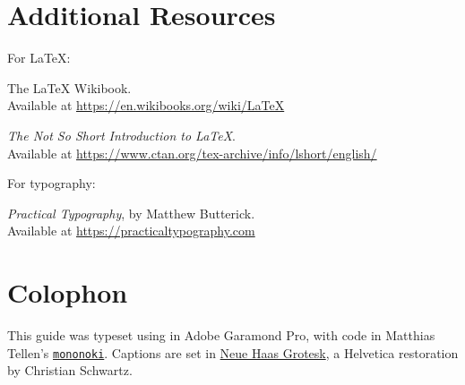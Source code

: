 \chapter{Additional Resources}

For \LaTeX:

\begin{adjustwidth}{1.5em}{0pt}
The \LaTeX{} Wikibook. \\
Available at \url{https://en.wikibooks.org/wiki/LaTeX}

\textit{The Not So Short Introduction to \LaTeX}. \\
Available at \url{https://www.ctan.org/tex-archive/info/lshort/english/}
\end{adjustwidth}
\vspace{0.3in}

For typography:

\begin{adjustwidth}{1.5em}{0pt}
\textit{Practical Typography}, by Matthew Butterick. \\
Available at \url{https://practicaltypography.com}
\end{adjustwidth}

\parindent 0pt
\theendnotes

\chapter{Colophon}

This guide was typeset using \LuaLaTeX{}
in Adobe Garamond Pro,
with code in Matthias Tellen's
\href{https://madmalik.github.io/mononoki/}{\texttt{mononoki}}.
Captions are set in
\href{http://www.fontbureau.com/NHG/}{\textsf{\small Neue Haas Grotesk}},
a Helvetica restoration by Christian Schwartz.

